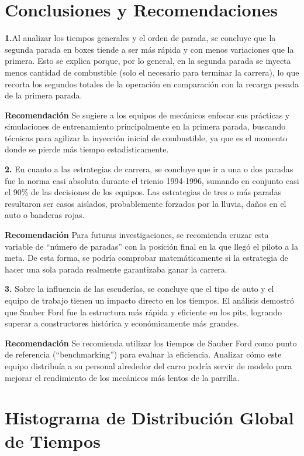 \documentclass[oneside,11pt]{Latex/Classes/PhDthesisPSnPDF}
\begin{document}
\chapter{Conclusiones y Recomendaciones}

\textbf{1.}Al analizar los tiempos generales y el orden de parada, se
concluye que la segunda parada en boxes tiende a ser más rápida y con
menos variaciones que la primera. Esto se explica porque, por lo
general, en la segunda parada se inyecta menos cantidad de combustible
(solo el necesario para terminar la carrera), lo que recorta los
segundos totales de la operación en comparación con la recarga pesada de
la primera parada.

\textbf{Recomendación} Se sugiere a los equipos de mecánicos enfocar sus
prácticas y simulaciones de entrenamiento principalmente en la primera
parada, buscando técnicas para agilizar la inyección inicial de
combustible, ya que es el momento donde se pierde más tiempo
estadísticamente.

\textbf{2.} En cuanto a las estrategias de carrera, se concluye que ir a
una o dos paradas fue la norma casi absoluta durante el trienio
1994-1996, sumando en conjunto casi el 90\% de las decisiones de los
equipos. Las estrategias de tres o más paradas resultaron ser casos
aislados, probablemente forzados por la lluvia, daños en el auto o
banderas rojas.

\textbf{Recomendación} Para futuras investigaciones, se recomienda
cruzar esta variable de ``número de paradas'' con la posición final en
la que llegó el piloto a la meta. De esta forma, se podría comprobar
matemáticamente si la estrategia de hacer una sola parada realmente
garantizaba ganar la carrera.

\textbf{3.} Sobre la influencia de las escuderías, se concluye que el
tipo de auto y el equipo de trabajo tienen un impacto directo en los
tiempos. El análisis demostró que Sauber Ford fue la estructura más
rápida y eficiente en los pits, logrando superar a constructores
histórica y económicamente más grandes.

\textbf{Recomendación} Se recomienda utilizar los tiempos de Sauber Ford
como punto de referencia (``benchmarking'') para evaluar la eficiencia.
Analizar cómo este equipo distribuía a su personal alrededor del carro
podría servir de modelo para mejorar el rendimiento de los mecánicos más
lentos de la parrilla.

\appendix
\renewcommand{\thechapter}{\Alph{chapter}}

\chapter{Histograma de Distribución Global de Tiempos}
\end{document}
